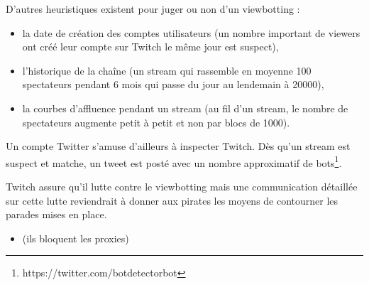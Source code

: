 \documentclass[a4paper]{article}
\begin{document}
D'autres heuristiques existent pour juger ou non d'un viewbotting :
\begin{itemize}
\item la date de création des comptes utilisateurs (un nombre important de viewers ont créé leur compte sur Twitch le même jour est suspect),
\item l'historique de la chaîne (un stream qui rassemble en moyenne 100 spectateurs pendant 6 mois qui passe du jour au lendemain à 20000),
\item la courbes d'affluence pendant un stream (au fil d'un stream, le nombre de spectateurs augmente petit à petit et non par blocs de 1000).
\end{itemize}
Un compte Twitter s'amuse d'ailleurs à inspecter Twitch. Dès qu'un stream est suspect et matche, un tweet est posté avec un nombre approximatif de bots\footnote{https://twitter.com/botdetectorbot}.

Twitch assure qu'il lutte contre le viewbotting mais une communication détaillée sur cette lutte reviendrait à donner aux pirates les moyens de contourner les parades mises en place. 
\begin{itemize}
\item (ils bloquent les proxies)
\end{itemize}
\end{document}
